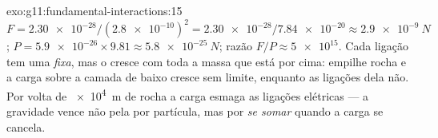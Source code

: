 \begin{solution}{exo:g11:fundamental-interactions:15}
$F = \num{2.30e-28}/(\num{2.8e-10})^2 = \num{2.30e-28}/\num{7.84e-20}
\approx \qty{2.9e-9}{N}$; 
$P = \num{5.9e-26} \times 9.81 \approx \qty{5.8e-25}{N}$; razão
$F/P \approx \num{5e15}$. Cada ligação tem uma  \emph{fixa}, mas o
 cresce com toda a massa que está por cima: empilhe rocha e a carga
sobre a camada de baixo cresce sem limite, enquanto as ligações dela
não. Por volta de \qty{e4}{m} de rocha a carga esmaga as ligações
elétricas --- a gravidade vence não pela  por partícula, mas por
\emph{se somar} quando a carga se cancela.
\end{solution}

